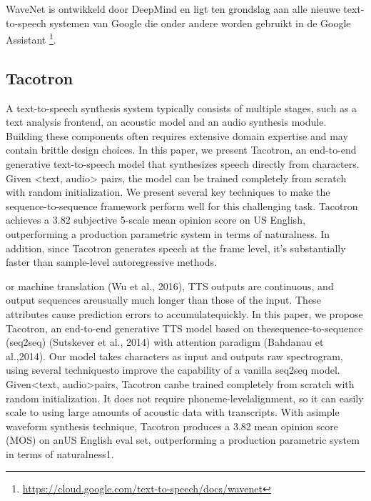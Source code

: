 WaveNet is ontwikkeld door DeepMind en ligt ten grondslag aan alle nieuwe text-to-speech systemen van Google die onder andere worden gebruikt in de Google Assistant \footnote{\url{https://cloud.google.com/text-to-speech/docs/wavenet}}.




\subsection{Tacotron}

\cite{Wang2017TacotronTE}
A text-to-speech synthesis system typically consists of multiple stages, such as a text analysis frontend, an acoustic model and an audio synthesis module. Building these components often requires extensive domain expertise and may contain brittle design choices. In this paper, we present Tacotron, an end-to-end generative text-to-speech model that synthesizes speech directly from characters. Given <text, audio> pairs, the model can be trained completely from scratch with random initialization. We present several key techniques to make the sequence-to-sequence framework perform well for this challenging task. Tacotron achieves a 3.82 subjective 5-scale mean opinion score on US English, outperforming a production parametric system in terms of naturalness. In addition, since Tacotron generates speech at the frame level, it's substantially faster than sample-level autoregressive methods. 


or machine translation (Wu et al., 2016),  TTS outputs are continuous,  and output sequences areusually much longer than those of the input. These attributes cause prediction errors to accumulatequickly.   In this paper,  we propose Tacotron,  an end-to-end generative TTS model based on thesequence-to-sequence (seq2seq) (Sutskever et al., 2014) with attention paradigm (Bahdanau et al.,2014).  Our model takes characters as input and outputs raw spectrogram, using several techniquesto improve the capability of a vanilla seq2seq model.   Given<text,  audio>pairs,  Tacotron canbe trained completely from scratch with random initialization.  It does not require phoneme-levelalignment, so it can easily scale to using large amounts of acoustic data with transcripts.  With asimple waveform synthesis technique, Tacotron produces a 3.82 mean opinion score (MOS) on anUS English eval set, outperforming a production parametric system in terms of naturalness1.



